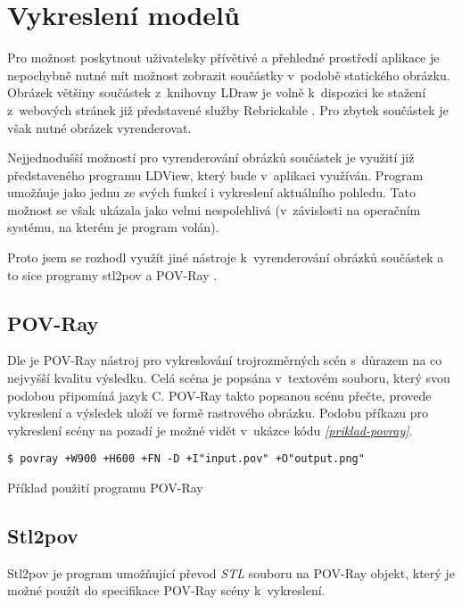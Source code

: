 \section{Vykreslení modelů}\label{reserse-vykresleni}
Pro možnost poskytnout uživatelsky přívětivé a přehledné prostředí aplikace je nepochybně nutné mít možnost zobrazit součástky v~podobě statického obrázku. Obrázek většiny součástek z~knihovny LDraw je volně k~dispozici ke stažení z~webových stránek již představené služby Rebrickable \autocite{rebrickable:download}. Pro zbytek součástek je však nutné obrázek vyrenderovat. 

Nejjednodušší možností pro vyrenderování obrázků součástek je využití již představeného programu LDView, který bude v~aplikaci využíván. Program umožňuje jako jednu ze svých funkcí i vykreslení aktuálního pohledu. Tato možnost se však ukázala jako velmi nespolehlivá (v~závislosti na operačním systému, na kterém je program volán).

Proto jsem se rozhodl využít jiné nástroje k~vyrenderování obrázků součástek a to sice programy stl2pov \autocite{stl2pov} a POV-Ray \autocite{povray}.

\subsection{POV-Ray}
Dle \autocite{root:povray} je POV-Ray nástroj pro vykreslování trojrozměrných scén s~důrazem na co nejvyšší kvalitu výsledku. Celá scéna je popsána v~textovém souboru, který svou podobou připomíná jazyk C. POV-Ray takto popsanou scénu přečte, provede vykreslení a výsledek uloží ve formě rastrového obrázku. Podobu příkazu pro vykreslení scény na pozadí je možné vidět v~ukázce kódu \emph{\ref{priklad-povray}}. 

\begin{listing}[htbp]
        \begin{verbatim}
$ povray +W900 +H600 +FN -D +I"input.pov" +O"output.png" 
        \end{verbatim}
    \caption{Příklad použití programu POV-Ray \label{priklad-povray}}
\end{listing}

\subsection{Stl2pov}
Stl2pov je program umožňující převod \textit{\gls{STL}} souboru na POV-Ray objekt, který je možné použít do specifikace POV-Ray scény k~vykreslení.  
